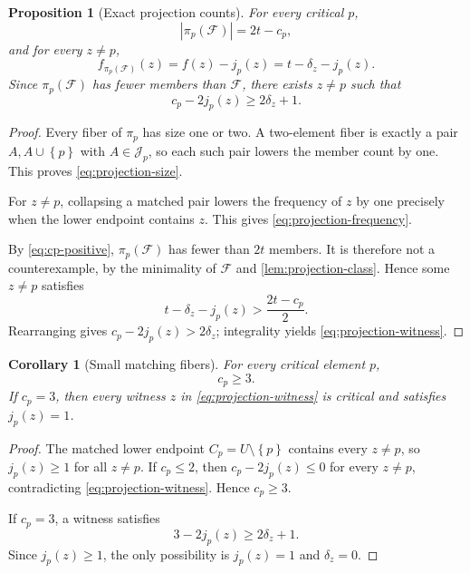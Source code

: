 \documentclass[11pt,reqno]{amsart}
\numberwithin{equation}{section}
\newtheorem{proposition}[proposition]{Proposition}
\newtheorem{corollary}[corollary]{Corollary}
\theoremstyle{definition}
\theoremstyle{remark}
\newcommand{\F}{\mathcal{F}}
\newcommand{\J}{\mathcal{J}}
\newcommand{\1}{\mathbf{1}}
\newcommand{\set}[1]{\left\{#1\right\}}
\newcommand{\abs}[1]{\left|#1\right|}
\begin{document}
\begin{proposition}[Exact projection counts]\label{prop:projection-counts}
For every critical \(p\),
\begin{equation}\label{eq:projection-size}
\abs{\pi_p(\F)}=2t-c_p,
\end{equation}
and for every \(z\ne p\),
\begin{equation}\label{eq:projection-frequency}
f_{\pi_p(\F)}(z)=f(z)-j_p(z)=t-\delta_z-j_p(z).
\end{equation}
Since \(\pi_p(\F)\) has fewer members than \(\F\), there exists \(z\ne p\) such that
\begin{equation}\label{eq:projection-witness}
\boxed{c_p-2j_p(z)\ge2\delta_z+1.}
\end{equation}
\end{proposition}

\begin{proof}
Every fiber of \(\pi_p\) has size one or two.  A two-element fiber is exactly a pair
\(
A,A\cup\set{p}
\)
with \(A\in\J_p\), so each such pair lowers the member count by one.  This proves \cref{eq:projection-size}.

For \(z\ne p\), collapsing a matched pair lowers the frequency of \(z\) by one precisely when the lower endpoint contains \(z\).  This gives \cref{eq:projection-frequency}.

By \cref{eq:cp-positive}, \(\pi_p(\F)\) has fewer than \(2t\) members.  It is therefore not a counterexample, by the minimality of \(\F\) and \cref{lem:projection-class}.  Hence some \(z\ne p\) satisfies
\[
t-\delta_z-j_p(z)
>
\frac{2t-c_p}{2}.
\]
Rearranging gives
\(
c_p-2j_p(z)>2\delta_z
\); integrality yields \cref{eq:projection-witness}.
\end{proof}

\begin{corollary}[Small matching fibers]\label{cor:cp-atleast3}
For every critical element \(p\),
\begin{equation}\label{eq:cp-atleast3}
\boxed{c_p\ge3.}
\end{equation}
If \(c_p=3\), then every witness \(z\) in \cref{eq:projection-witness} is critical and satisfies \(j_p(z)=1\).
\end{corollary}

\begin{proof}
The matched lower endpoint \(C_p=U\setminus\set{p}\) contains every \(z\ne p\), so \(j_p(z)\ge1\) for all \(z\ne p\).  If \(c_p\le2\), then
\(
c_p-2j_p(z)\le0
\)
for every \(z\ne p\), contradicting \cref{eq:projection-witness}.  Hence \(c_p\ge3\).

If \(c_p=3\), a witness satisfies
\[
3-2j_p(z)\ge2\delta_z+1.
\]
Since \(j_p(z)\ge1\), the only possibility is \(j_p(z)=1\) and \(\delta_z=0\).
\end{proof}
\end{document}
